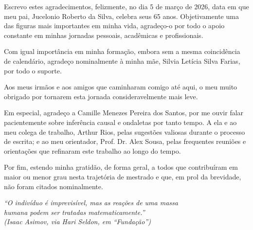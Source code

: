 \documentclass[
  oldfontcommands,
  sumario=tradicional,
  12pt,      %
  openright,    %
  oneside,    %
  a4paper,    %
  english,    %
  brazilian      %
]{imecc-unicamp}
\begin{document}
\begin{agradecimentos}
	Escrevo estes agradecimentos, felizmente, no dia 5 de março de 2026, data em que meu pai, Jucelonio Roberto da Silva, celebra seus 65 anos. Objetivamente uma das figuras mais importantes em minha vida, agradeço-o por todo o apoio constante em minhas jornadas pessoais, acadêmicas e profissionais.

	Com igual importância em minha formação, embora sem a mesma coincidência de calendário, agradeço nominalmente à minha mãe, Silvia Letícia Silva Farias, por todo o suporte.

	Aos meus irmãos e aos amigos que caminharam comigo até aqui, o meu muito obrigado por tornarem esta jornada consideravelmente mais leve.

	Em especial, agradeço a Camille Menezes Pereira dos Santos, por me ouvir falar pacientemente sobre inferência causal e ondaletas por tanto tempo. A ela e ao meu colega de trabalho, Arthur Rios, pelas sugestões valiosas durante o processo de escrita; e ao meu orientador, Prof. Dr. Alex Sousa, pelas frequentes reuniões e orientações que refinaram este trabalho ao longo do tempo.

	Por fim, estendo minha gratidão, de forma geral, a todos que contribuíram em maior ou menor grau nesta trajetória de mestrado e que, em prol da brevidade, não foram citados nominalmente.
\end{agradecimentos}
\begin{epigrafe}
  \vspace*{\fill}
  \begin{flushright}
    \textit{``O indivíduo é imprevisível, mas as reações de uma massa\\ humana podem ser tratadas matematicamente.''\\
    (Isaac Asimov, via Hari Seldon, em ``Fundação'')
    }
    
  \end{flushright}
\end{epigrafe}

\end{document}
